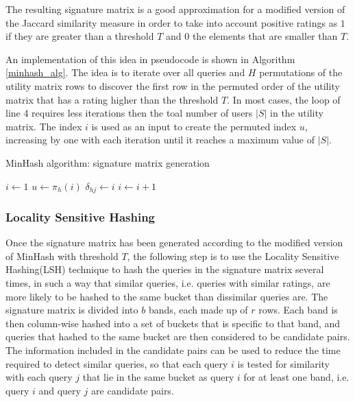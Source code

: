 The resulting signature matrix is a good approximation for a modified version of the Jaccard similarity measure in order to take into account positive ratings as $1$ if they are greater than a threshold $T$ and $0$ the elements that are smaller than $T$. 

An implementation of this idea in pseudocode is shown in Algorithm \ref{minhash_alg}. The idea is to iterate over all queries and $H$ permutations of the utility matrix rows to discover the first row in the permuted order of the utility matrix that has a rating higher than the threshold $T$. In most cases, the loop of line 4 requires less iterations then the toal number of users $|S|$ in the utility matrix.
The index $i$ is used as an input to create the permuted index $u$, increasing by one with each iteration until it reaches a maximum value of $|S|$. 

\begin{algorithm}[h]
    \caption{MinHash algorithm: signature matrix generation} 
    \begin{algorithmic}[1]
                \State $i \gets 1$ 
                    \State $u \gets \pi_h(i)$ 
                        \State $\delta_{hj} \gets i$
                    \EndIf
                    \State $i \gets i + 1$
                \EndWhile
            \EndFor
        \EndFor
    \end{algorithmic} 
    \label{minhash_alg}
\end{algorithm}

\subsubsection{Locality Sensitive Hashing} \label{lsh_description}
Once the signature matrix has been generated according to the modified version of MinHash with threshold $T$, the following step is to use the Locality Sensitive Hashing(LSH) technique to hash the queries in the signature matrix several times, in such a way that similar queries, i.e. queries with similar ratings, are more likely to be hashed to the same bucket than dissimilar queries are. The signature matrix is divided into $b$ bands, each made up of $r$ rows. Each band is then column-wise hashed into a set of buckets that is specific to that band, and queries that hashed to the same bucket are then considered to be candidate pairs. The information included in the candidate pairs can be used to reduce the time required to detect similar queries, so that each query $i$ is tested for similarity with each query $j$ that lie in the same bucket as query $i$ for at least one band, i.e. query $i$ and query $j$ are candidate pairs. 

